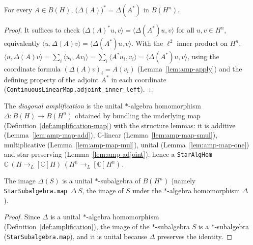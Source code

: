 \begin{lemma}
    \label{lem:amp-adjoint}
    \leanok
    For every $A \in B(H)$, $\bigl(\Delta(A)\bigr)^* = \Delta(A^*)$ in $B(H^n)$.
\end{lemma}
\begin{proof}
    It suffices to check $\langle \Delta(A)^* u, v\rangle = \langle \Delta(A^*) u, v\rangle$
    for all $u, v \in H^n$, equivalently
    $\langle u, \Delta(A) v\rangle = \langle \Delta(A^*) u, v\rangle$. With the
    $\ell^2$ inner product on $H^n$,
    $\langle u, \Delta(A) v\rangle = \sum_i \langle u_i, A v_i\rangle
    = \sum_i \langle A^* u_i, v_i\rangle = \langle \Delta(A^*) u, v\rangle$,
    using the coordinate formula $(\Delta(A) v)_i = A(v_i)$
    (Lemma~\ref{lem:amp-apply}) and the defining property of the adjoint $A^*$
    in each coordinate (\texttt{ContinuousLinearMap.adjoint\_inner\_left}).
\end{proof}

\begin{definition}
    \label{def:amplification}
    \leanok
    The \emph{diagonal amplification} is the unital $*$-algebra homomorphism
    $\Delta : B(H) \to B(H^n)$ obtained by bundling the underlying map
    (Definition~\ref{def:amplification-map}) with the structure lemmas: it is
    additive (Lemma~\ref{lem:amp-map-add}), $\mathbb C$-linear
    (Lemma~\ref{lem:amp-map-smul}), multiplicative (Lemma~\ref{lem:amp-map-mul}),
    unital (Lemma~\ref{lem:amp-map-one}) and star-preserving
    (Lemma~\ref{lem:amp-adjoint}), hence a \texttt{StarAlgHom}~$\mathbb C\
    (H \to_L[\mathbb C] H)\ (H^n \to_L[\mathbb C] H^n)$.
\end{definition}

\begin{lemma}
    \label{lem:amplification-subalgebra}
    \uses{def:amplification}
    \leanok
    The image $\Delta(S)$ is a unital $*$-subalgebra of $B(H^n)$ (namely
    \texttt{StarSubalgebra.map}~$\Delta\ S$, the image of $S$ under the
    $*$-algebra homomorphism $\Delta$).
\end{lemma}
\begin{proof}
    Since $\Delta$ is a unital $*$-algebra homomorphism
    (Definition~\ref{def:amplification}), the image of the $*$-subalgebra $S$ is
    a $*$-subalgebra (\texttt{StarSubalgebra.map}), and it is unital because
    $\Delta$ preserves the identity.
\end{proof}

